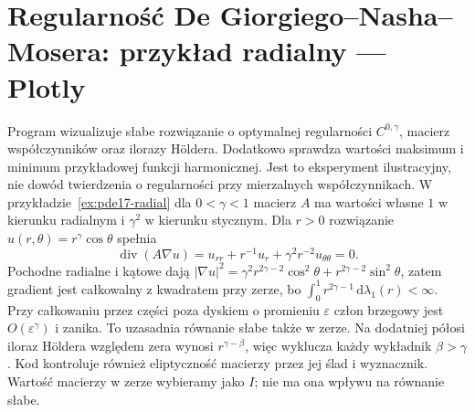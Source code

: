 \section{Regularność De Giorgiego--Nasha--Mosera: przykład radialny — Plotly}
\label{sec:pde17-code}
Program wizualizuje słabe rozwiązanie o optymalnej regularności
$C^{0,\gamma}$, macierz współczynników oraz ilorazy Höldera.
Dodatkowo sprawdza wartości maksimum i minimum przykładowej
funkcji harmonicznej. Jest to eksperyment ilustracyjny,
nie dowód twierdzenia o regularności przy mierzalnych współczynnikach.
W przykładzie~\ref{ex:pde17-radial} dla $0<\gamma<1$
macierz $A$ ma wartości własne $1$ w kierunku radialnym
i $\gamma^2$ w kierunku stycznym. Dla $r>0$ rozwiązanie
$u(r,\theta)=r^\gamma\cos\theta$ spełnia
\[
 \operatorname{div}(A\nabla u)
 =u_{rr}+r^{-1}u_r+\gamma^2r^{-2}u_{\theta\theta}=0.
\]
Pochodne radialne i kątowe dają
$|\nabla u|^2=\gamma^2r^{2\gamma-2}\cos^2\theta
+r^{2\gamma-2}\sin^2\theta$, zatem gradient jest
całkowalny z kwadratem przy zerze, bo
$\int_0^1r^{2\gamma-1}\,\mathrm d\lambda_1(r)<\infty$.
Przy całkowaniu przez części poza dyskiem o promieniu
$\varepsilon$ człon brzegowy jest $O(\varepsilon^\gamma)$
i zanika. To uzasadnia równanie słabe także w zerze.
Na dodatniej półosi iloraz Höldera względem zera
wynosi $r^{\gamma-\beta}$, więc wyklucza każdy
wykładnik $\beta>\gamma$. Kod kontroluje również
eliptyczność macierzy przez jej ślad i wyznacznik.
Wartość macierzy w zerze wybieramy jako $I$;
nie ma ona wpływu na równanie słabe.
